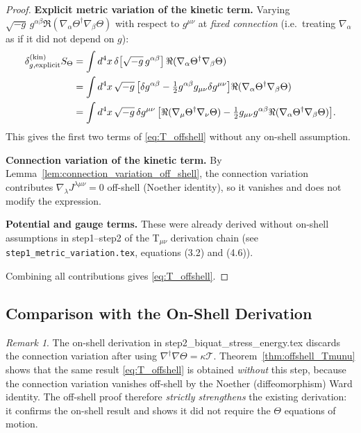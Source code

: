 \documentclass[12pt]{article}
\theoremstyle{definition}
\theoremstyle{remark}
\newtheorem{remark}[theorem]{Remark}
\begin{document}
\begin{proof}
\textbf{Explicit metric variation of the kinetic term.}
Varying $\sqrt{-g}\,g^{\alpha\beta}\Re(\nabla_\alpha\Theta^\dagger\nabla_\beta\Theta)$
with respect to $g^{\mu\nu}$ at \emph{fixed connection} (i.e.\ treating $\nabla_\alpha$
as if it did not depend on $g$):
\begin{align}
  \delta_{g,\text{explicit}}^{(\text{kin})} S_\Theta
  &= \int d^4x\,\delta\bigl[\sqrt{-g}\,g^{\alpha\beta}\bigr]\,
     \Re(\nabla_\alpha\Theta^\dagger\nabla_\beta\Theta)
  \notag\\
  &= \int d^4x\,\sqrt{-g}\,\bigl[\delta g^{\alpha\beta}
     - \tfrac{1}{2}g^{\alpha\beta}g_{\mu\nu}\delta g^{\mu\nu}\bigr]
     \Re(\nabla_\alpha\Theta^\dagger\nabla_\beta\Theta)
  \notag\\
  &= \int d^4x\,\sqrt{-g}\,\delta g^{\mu\nu}\,
     \bigl[\Re(\nabla_\mu\Theta^\dagger\nabla_\nu\Theta)
     - \tfrac{1}{2}g_{\mu\nu}g^{\alpha\beta}\Re(\nabla_\alpha\Theta^\dagger\nabla_\beta\Theta)
     \bigr].
\end{align}
This gives the first two terms of \eqref{eq:T_offshell} without any on-shell assumption.

\textbf{Connection variation of the kinetic term.}
By Lemma~\ref{lem:connection_variation_off_shell}, the connection variation
contributes $\nabla_\lambda J^{\lambda\mu\nu}=0$ off-shell (Noether identity),
so it vanishes and does not modify the expression.

\textbf{Potential and gauge terms.}
These were already derived without on-shell assumptions in step1--step2 of the
T$_{\mu\nu}$ derivation chain (see \texttt{step1\_metric\_variation.tex},
equations (3.2) and (4.6)).

Combining all contributions gives \eqref{eq:T_offshell}.
\end{proof}

\subsection{Comparison with the On-Shell Derivation}

\begin{remark}
The on-shell derivation in step2\_biquat\_stress\_energy.tex discards the connection
variation after using $\nabla^\dagger\nabla\Theta=\kappa\mathcal{T}$.
Theorem~\ref{thm:offshell_Tmunu} shows that the same result \eqref{eq:T_offshell}
is obtained \emph{without} this step, because the connection variation vanishes off-shell
by the Noether (diffeomorphism) Ward identity.  The off-shell proof therefore
\emph{strictly strengthens} the existing derivation: it confirms the on-shell result
and shows it did not require the $\Theta$ equations of motion.
\end{remark}
\end{document}
